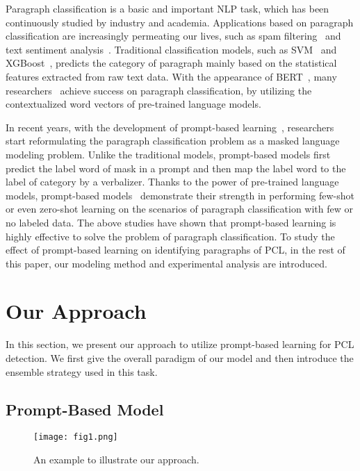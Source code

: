 \documentclass[11pt]{article}
\begin{document}
Paragraph classification is a basic and important NLP task, which has been continuously studied by industry and academia.
Applications based on paragraph classification are increasingly permeating our lives, such as spam filtering~\cite{kumar2020predictive} and text sentiment analysis~\cite{gao2019target}.
Traditional classification models, such as SVM~\cite{joachims1998text} and XGBoost~\cite{chen2016xgboost}, predicts the category of paragraph mainly based on the statistical features extracted from raw text data.
With the appearance of BERT~\cite{devlin2018bert}, many researchers~\cite{croce2020gan,jin2020bert} achieve success on paragraph classification, by utilizing the contextualized word vectors of pre-trained language models.

In recent years, with the development of prompt-based learning~\cite{schick2020s,schick2020exploiting,brown2020language}, researchers start reformulating the paragraph classification problem as a masked language modeling problem. 
Unlike the traditional models, prompt-based models first predict the label word of mask in a prompt and then map the label word to the label of category by a verbalizer.
Thanks to the power of pre-trained language models, prompt-based models~\cite{hu2021knowledgeable,gu2021ppt} demonstrate their strength in performing few-shot or even zero-shot learning on the scenarios of paragraph classification with few or no labeled data. 
The above studies have shown that prompt-based learning is highly effective to solve the problem of paragraph classification.
To study the effect of prompt-based learning on identifying paragraphs of PCL, in the rest of this paper, our modeling method and experimental analysis are introduced.


\section{Our Approach}
In this section, we present our approach to utilize prompt-based learning for PCL detection.
We first give the overall paradigm of our model and then introduce the ensemble strategy used in this task.

\subsection{Prompt-Based Model}\label{prompt}

\begin{figure*}
    \centering
    \texttt{[image: fig1.png]}
    \caption{An example to illustrate our approach.}
    \label{fig:fig1}
\end{figure*}
\end{document}
